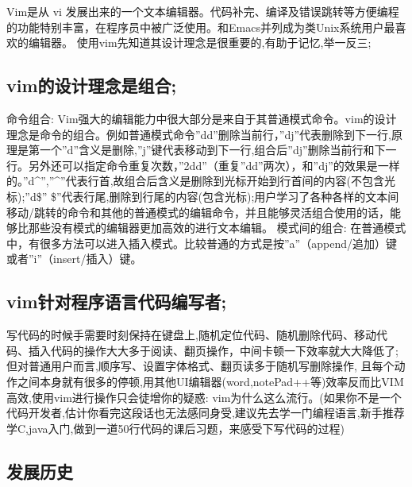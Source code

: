 \documentclass[11pt]{article}
\begin{document}
  Vim是从 vi 发展出来的一个文本编辑器。代码补完、编译及错误跳转等方便编程的功能特别丰富，在程序员中被广泛使用。和Emacs并列成为类Unix系统用户最喜欢的编辑器。
  使用vim先知道其设计理念是很重要的,有助于记忆,举一反三;
\subsection{vim的设计理念是组合;}
\label{sec-12-1}

   命令组合: Vim强大的编辑能力中很大部分是来自于其普通模式命令。vim的设计理念是命令的组合。例如普通模式命令''dd''删除当前行，''dj''代表删除到下一行,原理是第一个''d''含义是删除,''j''键代表移动到下一行,组合后''dj''删除当前行和下一行。另外还可以指定命令重复次数，''2dd''（重复''dd''两次），和''dj''的效果是一样的。''d^'',''^''代表行首,故组合后含义是删除到光标开始到行首间的内容(不包含光标);''d\$'' \$''代表行尾,删除到行尾的内容(包含光标);用户学习了各种各样的文本间移动/跳转的命令和其他的普通模式的编辑命令，并且能够灵活组合使用的话，能够比那些没有模式的编辑器更加高效的进行文本编辑。
   模式间的组合: 在普通模式中，有很多方法可以进入插入模式。比较普通的方式是按''a''（append/追加）键或者''i''（insert/插入）键。
\subsection{vim针对程序语言代码编写者;}
\label{sec-12-2}

   写代码的时候手需要时刻保持在键盘上,随机定位代码、随机删除代码、移动代码、插入代码的操作大大多于阅读、翻页操作，中间卡顿一下效率就大大降低了;但对普通用户而言,顺序写、设置字体格式、翻页读多于随机写删除操作, 且每个动作之间本身就有很多的停顿,用其他UI编辑器(word,notePad++等)效率反而比VIM高效,使用vim进行操作只会徒增你的疑惑: vim为什么这么流行。(如果你不是一个代码开发者,估计你看完这段话也无法感同身受,建议先去学一门编程语言,新手推荐学C,java入门,做到一道50行代码的课后习题，来感受下写代码的过程)
\subsection{发展历史}
\label{sec-12-3}
\end{document}
